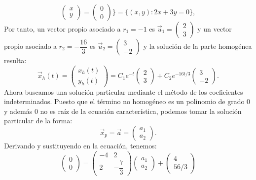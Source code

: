 \begin{ejemplo}
\begin{equation}
\begin{pmatrix}
			x \\ 
			y
		\end{pmatrix} = \begin{pmatrix}
			0 \\ 
			0  
		\end{pmatrix}\} = \{(x,y): 2x + 3y = 0\},
	\end{equation}
	Por tanto, un vector propio asociado a $r_1 = -1$ es $\vec{u}_1 = \begin{pmatrix}
		2 \\ 
		3
	\end{pmatrix}$ y un vector propio asociado a $r_2 = -\dfrac{16}{3}$ es $\vec{u}_2 = \begin{pmatrix}
	3 \\ 
	-2
	\end{pmatrix}$ y la solución de la parte homogénea resulta:
	\begin{equation}
		\vec{x}_h(t) = \begin{pmatrix}	x_h(t) \\ y_h(t)	\end{pmatrix} = C_1e^{-t}\begin{pmatrix}	2 \\ 3	\end{pmatrix} + C_2e^{-16t/3}\begin{pmatrix}	3 \\ -2	\end{pmatrix}.
	\end{equation}
	Ahora buscamos una solución particular mediante el método de los coeficientes
	indeterminados. Puesto que el término no homogéneo es un polinomio de grado
	$0$ y además $0$ no es raíz de la ecuación característica, podemos tomar la solución particular de la forma:
	\begin{equation}
		\vec{x}_p = \vec{a} = \begin{pmatrix}	a_1 \\ a_2	\end{pmatrix}.
	\end{equation}
	Derivando y sustituyendo en la ecuación, tenemos:
	\begin{equation}
		\begin{pmatrix}	0 \\ 0	\end{pmatrix} = \begin{pmatrix}
		    -4 & 2\\ 
			2 & -\dfrac{7}{3}
		\end{pmatrix} \begin{pmatrix}	a_1 \\ a_2	\end{pmatrix} +  \begin{pmatrix}	4 \\ 56/3	\end{pmatrix}

\end{equation}
\end{ejemplo}
